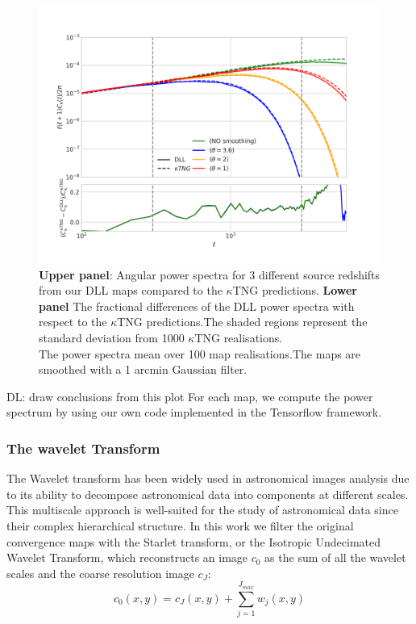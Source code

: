 \documentclass[twocolumn,twocolappendix]{aastex63}
\newcommand{\denise}[1]{{\color{red}DL: #1}}
\begin{document}
\begin{figure}
    \centering
    \includegraphics[width=\columnwidth]{paper/figures/clsktng_compsmoothing.png}
    \caption{
    \textbf{Upper panel}: Angular power spectra for 3 different source redshifts from
our DLL maps compared to the $\kappa$TNG predictions.
 \textbf{Lower panel}
The fractional differences of the DLL power spectra with respect to the $\kappa$TNG predictions.The shaded regions represent the standard deviation from 1000 $\kappa$TNG realisations. \\
 The power spectra mean over 100 map realisations.The maps are smoothed with a 1 arcmin Gaussian filter. }
    \label{fig:clsktng_compsmoothing}
\end{figure}
\denise{draw conclusions from this plot}
For each map, we compute the power spectrum by using our own code implemented in the Tensorflow framework.

\subsubsection{The wavelet Transform }

The Wavelet transform has been widely used in astronomical images analysis due to its ability to decompose astronomical data into components at different scales. 
This multiscale approach is well-suited for the study of astronomical data since their complex hierarchical structure. 
In this work we filter the original convergence maps with the Starlet transform, or the Isotropic Undecimated Wavelet Transform, which reconstructs an image $c_0$ as the sum of all the wavelet scales and the coarse resolution image $c_J$:
\begin{equation}
    c_0(x,y)=c_J(x,y)+\sum_{j=1}^{J_{max}} w_j(x,y)
\end{equation}
\end{document}
